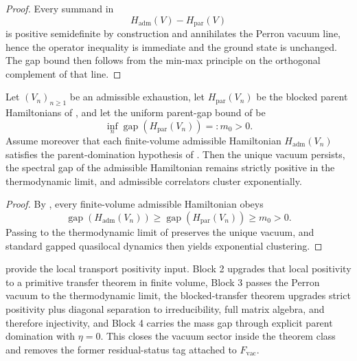 \begin{proof}
Every summand in
\[
H_{\mathrm{adm}}(V)-H_{\mathrm{par}}(V)
\]
is positive semidefinite by construction and annihilates the Perron vacuum line, hence the operator
inequality is immediate and the ground state is unchanged. The gap bound then follows from the
min-max principle on the orthogonal complement of that line.
\end{proof}

\begin{theorem}
\label{thm:gap-stability-thermo-limit}
Let $(V_n)_{n\ge 1}$ be an admissible exhaustion, let $H_{\mathrm{par}}(V_n)$ be the blocked
parent Hamiltonians of , and let the uniform parent-gap
bound of  be
\[
\inf_n \operatorname{gap}(H_{\mathrm{par}}(V_n))=:m_0>0.
\]
Assume moreover that each finite-volume admissible Hamiltonian $H_{\mathrm{adm}}(V_n)$ satisfies
the parent-domination hypothesis of . Then the unique vacuum
persists, the spectral gap of the admissible Hamiltonian remains strictly positive in the
thermodynamic limit, and admissible
correlators cluster exponentially.
\end{theorem}

\begin{proof}
By , every finite-volume admissible Hamiltonian obeys
\[
\operatorname{gap}(H_{\mathrm{adm}}(V_n))
\ge
\operatorname{gap}(H_{\mathrm{par}}(V_n))
\ge
m_0>0.
\]
Passing to the thermodynamic limit of  preserves the unique vacuum,
and standard gapped quasilocal dynamics then yields exponential clustering.
\end{proof}

\begin{remark}
\label{rem:vacuum-honest-status}
 provide the local transport
positivity input. Block 2 upgrades that local positivity to a primitive transfer theorem in finite
volume, Block 3 passes the Perron vacuum to the thermodynamic limit, the blocked-transfer theorem
upgrades strict positivity plus diagonal separation to irreducibility, full matrix algebra, and
therefore injectivity, and Block 4 carries the mass gap through explicit parent domination with
$\eta=0$. This closes the vacuum sector inside the theorem class and removes the former
residual-status tag attached to $F_{\mathrm{vac}}$.
\end{remark}

